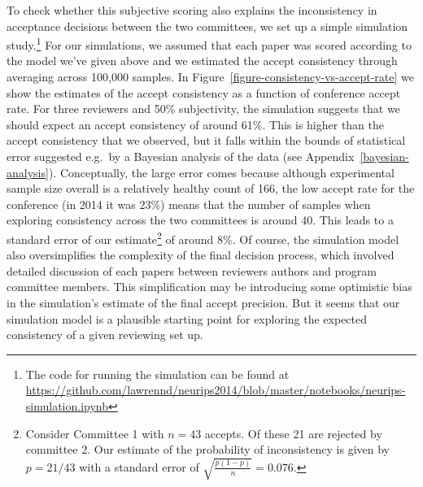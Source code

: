 \documentclass[twoside]{article}
\begin{document}
To check whether this subjective scoring also explains the
inconsistency in acceptance decisions between the two committees, we set up a
simple simulation study.\footnote{The code for running the simulation can be found at \url{https://github.com/lawrennd/neurips2014/blob/master/notebooks/neurips-simulation.ipynb}} For our simulations, we assumed that each
paper was scored according to the model we've given above and we
estimated the accept consistency through averaging across 100,000
samples. In Figure~\ref{figure-consistency-vs-accept-rate} we show the
estimates of the accept consistency as a function of conference accept
rate. For three reviewers and 50\% subjectivity, the simulation
suggests that we should expect an accept consistency of around
61\%. This is higher than the accept consistency that we observed, but
it falls within the bounds of statistical error suggested e.g.\ by a
Bayesian analysis of the data (see Appendix~\ref{bayesian-analysis}). Conceptually, the large error comes because
although experimental sample size overall is a relatively healthy count of 166,
the low accept rate for the conference (in 2014 it was 23\%) means that the number of
samples when exploring consistency across the two committees is around
40. This leads to a standard error of our
estimate\footnote{Consider Committee 1 with $n=43$ accepts. Of these
  21 are rejected by committee 2. Our estimate of the probability of
  inconsistency is given by $p=21/43$ with a standard error of
  $\sqrt{\frac{p(1-p)}{n}} = 0.076$.} of around 8\%.  Of course, the
simulation model also oversimplifies the complexity of the final
decision process, which involved detailed discussion of each papers
between reviewers authors and program committee members. This
simplification may be introducing some optimistic bias in the
simulation's estimate of the final accept precision. But it seems that
our simulation model is a plausible starting point for exploring
the expected consistency of a given reviewing set up.
\end{document}
